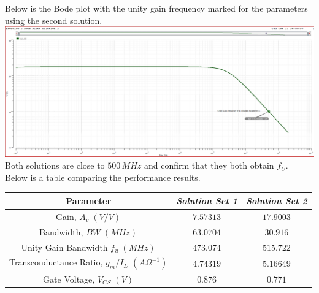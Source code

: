 \documentclass[12pt, fleqn]{article}
\begin{document}
Below is the Bode plot with the unity gain frequency marked for the parameters using the second solution.\\[0.25cm]
\includegraphics[scale=0.25, center]{bode3.PNG}\\[0.25cm]
Both solutions are close to $500\,MHz$ and confirm that they both obtain $f_U$.\\[0.25cm]
\newpage\noindent
Below is a table comparing the performance results.
    \begin{table}[H]
    \centering
    \setlength{\tabcolsep}{20pt}
    \renewcommand{\arraystretch}{1.5}
        \begin{tabular}{|c|c|c|}
            \hline
            \textbf{Parameter} & \textit{Solution Set 1} & \textit{Solution Set 2}\\
            \hline
            Gain, $A_v\;(V/V)$ & $7.57313$ & $17.9003$\\
            \hline
            Bandwidth, $BW\;(MHz)$ & $63.0704$ & $30.916$\\
            \hline
            Unity Gain Bandwidth $f_u\;(MHz)$ & $473.074$ & $515.722$\\
            \hline
            Transconductance Ratio, $g_m / I_D\;({A\Omega}^{-1})$ & $4.74319$ & $5.16649$\\
            \hline
            Gate Voltage, $V_{GS}\;(V)$ & $0.876$ & $0.771$\\
            \hline
        \end{tabular}
    \end{table}
\newpage
\end{document}
